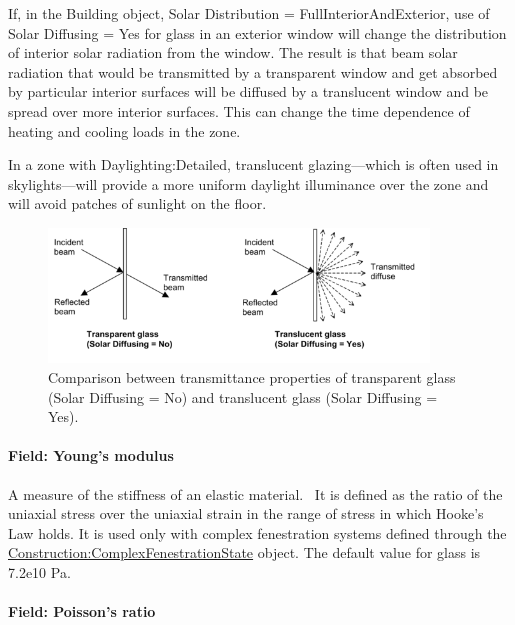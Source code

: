 If, in the Building object, Solar Distribution = FullInteriorAndExterior, use of Solar Diffusing = Yes for glass in an exterior window will change the distribution of interior solar radiation from the window. The result is that beam solar radiation that would be transmitted by a transparent window and get absorbed by particular interior surfaces will be diffused by a translucent window and be spread over more interior surfaces. This can change the time dependence of heating and cooling loads in the zone.

In a zone with Daylighting:Detailed, translucent glazing---which is often used in skylights---will provide a more uniform daylight illuminance over the zone and will avoid patches of sunlight on the floor.

\begin{figure}[hbtp] %
\centering
\includegraphics[width=0.9\textwidth, height=0.9\textheight, keepaspectratio=true]{media/image025.png}
\caption{Comparison between transmittance properties of transparent glass (Solar Diffusing = No) and translucent glass (Solar Diffusing = Yes). \protect \label{fig:comparison-between-transmittance-properties}}
\end{figure}

\paragraph{Field: Young's modulus}\label{field-youngs-modulus}

A measure of the stiffness of an elastic material.~ It is defined as the ratio of the uniaxial stress over the uniaxial strain in the range of stress in which Hooke's Law holds. It is used only with complex fenestration systems defined through the \hyperref[constructioncomplexfenestrationstate]{Construction:ComplexFenestrationState} object. The default value for glass is 7.2e10 Pa.

\paragraph{Field: Poisson's ratio}\label{field-poissons-ratio}


